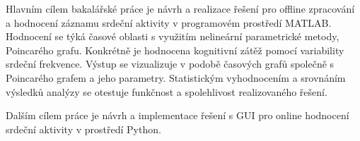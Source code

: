Hlavním cílem bakalářské práce je návrh a realizace řešení pro offline
zpracování a hodnocení záznamu srdeční aktivity v programovém prostředí MATLAB.
Hodnocení se týká časové oblasti s využitím nelineární parametrické metody,
Poincarého grafu. Konkrétně je hodnocena kognitivní zátěž pomocí variability
srdeční frekvence. Výstup se vizualizuje v podobě časových grafů společně s
Poincarého grafem a jeho parametry. Statistickým vyhodnocením a srovnáním
výsledků analýzy se otestuje funkčnost a spolehlivost realizovaného řešení.

Dalším cílem práce je návrh a implementace řešení s GUI pro online hodnocení
srdeční aktivity v prostředí Python.

